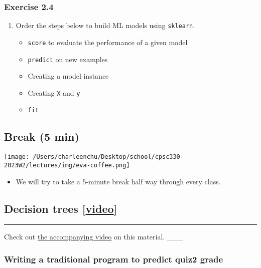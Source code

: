 \documentclass[11pt]{article}
\providecommand{\tightlist}{%
      \setlength{\itemsep}{0pt}\setlength{\parskip}{0pt}}
\begin{document}
\subsubsection{Exercise 2.4}\label{exercise-2.4}

\begin{enumerate}
\def\labelenumi{\arabic{enumi}.}
\tightlist
\item
  Order the steps below to build ML models using \texttt{sklearn}.

  \begin{itemize}
  \tightlist
  \item
    \texttt{score} to evaluate the performance of a given model
  \item
    \texttt{predict} on new examples
  \item
    Creating a model instance
  \item
    Creating \texttt{X} and \texttt{y}
  \item
    \texttt{fit}
  \end{itemize}
\end{enumerate}

    

    \subsection{Break (5 min)}\label{break-5-min}

\texttt{[image: /Users/charleenchu/Desktop/school/cpsc330-2023W2/lectures/img/eva-coffee.png]}

\begin{itemize}
\tightlist
\item
  We will try to take a 5-minute break half way through every class.
\end{itemize}

    

    \subsection{\texorpdfstring{Decision trees
{[}\href{https://youtu.be/Hcf19Ij35rA}{video}{]}}{Decision trees {[}video{]}}}\label{decision-trees-video}

    \begin{center}\rule{0.5\linewidth}{0.5pt}\end{center}

Check out \href{https://youtu.be/Hcf19Ij35rA}{the accompanying video} on
this material. \_\_\_

    \subsubsection{Writing a traditional program to predict quiz2
grade}\label{writing-a-traditional-program-to-predict-quiz2-grade}
\end{document}
